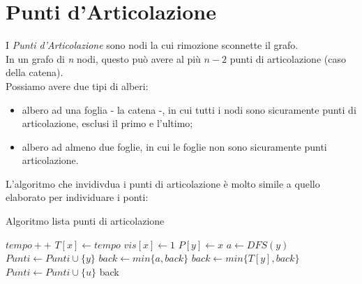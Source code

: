 \section{Punti d'Articolazione}
I \textit{Punti d'Articolazione} sono nodi la cui rimozione sconnette il grafo. \\
In un grafo di \textit{n} nodi, questo può avere al più $n-2$ punti di articolazione (caso della catena). \\
Possiamo avere due tipi di alberi:
\begin{itemize}
    \item albero ad una foglia - la catena -, in cui tutti i nodi sono sicuramente punti di articolazione, esclusi il primo e l'ultimo;
    \item albero ad almeno due foglie, in cui le foglie non sono sicuramente punti articolazione.
\end{itemize}
L'algoritmo che invidivdua i punti di articolazione è molto simile a quello elaborato per individuare i ponti:
\begin{algorithm}
	\caption{Algoritmo lista punti di articolazione}\label{alg:listaPuntiArticolazione}
	\begin{algorithmic}[1]
		 
			\State $tempo++$
			\State $T[x] \gets tempo$
			\State $vis[x] \gets 1$
					\State $P[y] \gets x$
					\State $a \gets DFS(y)$
						\State $Punti \gets Punti \cup \{y\}$
					\EndIf
					\State $back \gets min\{a,back\}$
					\State $back \gets min\{T[y],back\}$
				\EndIf
			\EndFor
				\State $Punti \gets Punti \cup \{u\}$
			\EndIf
			\State \Return back
		\EndFunction
	\end{algorithmic}
\end{algorithm} \hfill \\

